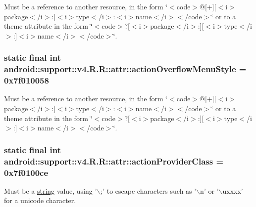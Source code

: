 Must be a reference to another resource, in the form \char`\"{}$<$code$>$@\mbox{[}+\mbox{]}\mbox{[}$<$i$>$package$<$/i$>$:\mbox{]}$<$i$>$type$<$/i$>$:$<$i$>$name$<$/i$>$$<$/code$>$\char`\"{} or to a theme attribute in the form \char`\"{}$<$code$>$?\mbox{[}$<$i$>$package$<$/i$>$:\mbox{]}\mbox{[}$<$i$>$type$<$/i$>$:\mbox{]}$<$i$>$name$<$/i$>$$<$/code$>$\char`\"{}. \hypertarget{classandroid_1_1support_1_1v4_1_1_r_1_1attr_5a9b799a3f7bda0187bbb2f2599370ef}{
\subsubsection[{actionOverflowMenuStyle}]{\setlength{\rightskip}{0pt plus 5cm}static final int android::support::v4.R.R::attr::actionOverflowMenuStyle = 0x7f010058}}
\label{classandroid_1_1support_1_1v4_1_1_r_1_1attr_5a9b799a3f7bda0187bbb2f2599370ef}


Must be a reference to another resource, in the form \char`\"{}$<$code$>$@\mbox{[}+\mbox{]}\mbox{[}$<$i$>$package$<$/i$>$:\mbox{]}$<$i$>$type$<$/i$>$:$<$i$>$name$<$/i$>$$<$/code$>$\char`\"{} or to a theme attribute in the form \char`\"{}$<$code$>$?\mbox{[}$<$i$>$package$<$/i$>$:\mbox{]}\mbox{[}$<$i$>$type$<$/i$>$:\mbox{]}$<$i$>$name$<$/i$>$$<$/code$>$\char`\"{}. \hypertarget{classandroid_1_1support_1_1v4_1_1_r_1_1attr_9fb06a1f50e16513cdf327c9daa4b666}{
\subsubsection[{actionProviderClass}]{\setlength{\rightskip}{0pt plus 5cm}static final int android::support::v4.R.R::attr::actionProviderClass = 0x7f0100ce}}
\label{classandroid_1_1support_1_1v4_1_1_r_1_1attr_9fb06a1f50e16513cdf327c9daa4b666}


Must be a \hyperlink{classandroid_1_1support_1_1v4_1_1_r_1_1string}{string} value, using '$\backslash$;' to escape characters such as '$\backslash$n' or '$\backslash$uxxxx' for a unicode character. 

